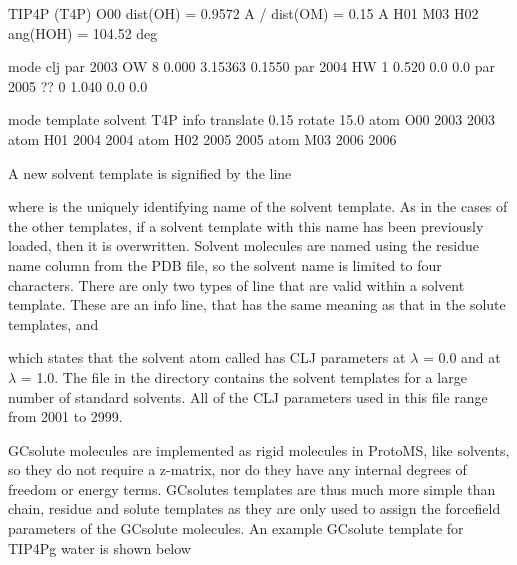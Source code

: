 \documentclass[letterpaper,10pt,english]{sphinxmanual}
\begin{document}
%
\begin{sphinxVerbatim}[commandchars=\\\{\}]
\PYGZsh{}
\PYGZsh{} TIP4P (T4P)
\PYGZsh{}
\PYGZsh{}     O00       dist(OH) = 0.9572 A
\PYGZsh{}   /  \textbar{}  \PYGZbs{}     dist(OM) = 0.15 A
\PYGZsh{} H01 M03 H02   ang(HOH) = 104.52 deg
\PYGZsh{}

mode clj
par 2003  OW  8  0.000  3.15363  0.1550
par 2004  HW  1  0.520  0.0      0.0
par 2005  ??  0 \PYGZhy{}1.040  0.0      0.0

mode template
solvent T4P
info translate 0.15 rotate 15.0
atom O00 2003 2003
atom H01 2004 2004
atom H02 2005 2005
atom M03 2006 2006
\end{sphinxVerbatim}

A new solvent template is signified by the line

%
\begin{sphinxVerbatim}[commandchars=\\\{\}]
 
\end{sphinxVerbatim}

where  is the uniquely identifying name of the solvent template. As in the cases of the other templates, if a solvent template with this name has been previously loaded, then it is overwritten. Solvent molecules are named using the residue name column from the PDB file, so the solvent name is limited to four characters. There are only two types of line that are valid within a solvent template. These are an info line, that has the same meaning as that in the solute templates, and

%
\begin{sphinxVerbatim}[commandchars=\\\{\}]
   
\end{sphinxVerbatim}

which states that the solvent atom called  has CLJ parameters  at \(\lambda\) = 0.0 and  at \(\lambda\) = 1.0. The file  in the  directory contains the solvent templates for a large number of standard solvents. All of the CLJ parameters used in this file range from 2001 to 2999.


GCsolute molecules are implemented as rigid molecules in ProtoMS, like solvents, so they do not require a z-matrix, nor do they have any internal degrees of freedom or energy terms. GCsolutes templates are thus much more simple than chain, residue and solute templates as they are only used to assign the forcefield parameters of the GCsolute molecules. An example GCsolute template for TIP4Pg water is shown below
\end{document}
